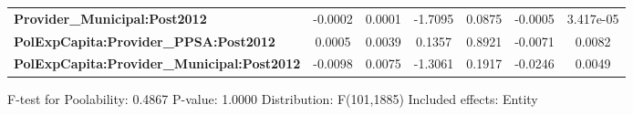 \begin{center}
\begin{tabular}{lcccccc}
\textbf{Provider\_Municipal:Post2012}              &      -0.0002       &       0.0001       &     -1.7095     &      0.0875      &      -0.0005      &     3.417e-05      \\
\textbf{PolExpCapita:Provider\_PPSA:Post2012}      &       0.0005       &       0.0039       &      0.1357     &      0.8921      &      -0.0071      &       0.0082       \\
\textbf{PolExpCapita:Provider\_Municipal:Post2012} &      -0.0098       &       0.0075       &     -1.3061     &      0.1917      &      -0.0246      &       0.0049       \\
\bottomrule
\end{tabular}
\end{center}

F-test for Poolability: 0.4867 \newline
 P-value: 1.0000 \newline
 Distribution: F(101,1885) \newline
  \newline
 Included effects: Entity